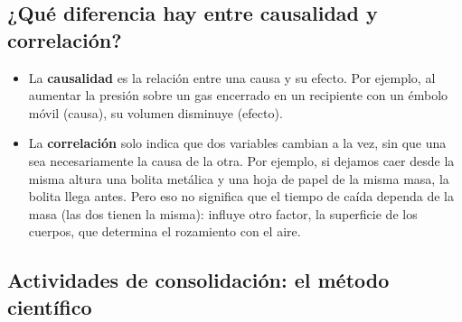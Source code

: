 \subsection{¿Qué diferencia hay entre causalidad y correlación?}

\begin{itemize}
    \item La \textbf{causalidad} es la relación entre una causa y su efecto. Por ejemplo, al aumentar la presión sobre un gas encerrado en un recipiente con un émbolo móvil (causa), su volumen disminuye (efecto).
    \item La \textbf{correlación} solo indica que dos variables cambian a la vez, sin que una sea necesariamente la causa de la otra. Por ejemplo, si dejamos caer desde la misma altura una bolita metálica y una hoja de papel de la misma masa, la bolita llega antes. Pero eso no significa que el tiempo de caída dependa de la masa (las dos tienen la misma): influye otro factor, la superficie de los cuerpos, que determina el rozamiento con el aire.
\end{itemize}

\subsection*{Actividades de consolidación: el método científico}

